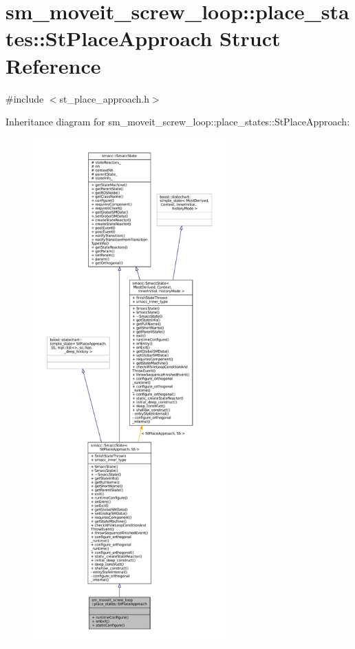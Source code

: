 \hypertarget{structsm__moveit__screw__loop_1_1place__states_1_1StPlaceApproach}{}\section{sm\+\_\+moveit\+\_\+screw\+\_\+loop\+:\+:place\+\_\+states\+:\+:St\+Place\+Approach Struct Reference}
\label{structsm__moveit__screw__loop_1_1place__states_1_1StPlaceApproach}


{\ttfamily \#include $<$st\+\_\+place\+\_\+approach.\+h$>$}



Inheritance diagram for sm\+\_\+moveit\+\_\+screw\+\_\+loop\+:\+:place\+\_\+states\+:\+:St\+Place\+Approach\+:
\nopagebreak
\begin{figure}[H]
\begin{center}
\leavevmode
\includegraphics[height=550pt]{structsm__moveit__screw__loop_1_1place__states_1_1StPlaceApproach__inherit__graph}
\end{center}
\end{figure}


